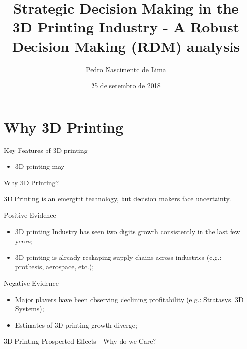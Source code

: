 \documentclass[ignorenonframetext,]{beamer}
\title{Strategic Decision Making in the 3D Printing Industry - A Robust
Decision Making (RDM) analysis}
\author{Pedro Nascimento de Lima}
\date{25 de setembro de 2018}
\providecommand{\tightlist}{%
  \setlength{\itemsep}{0pt}\setlength{\parskip}{0pt}}
\begin{document}
\frame{\titlepage}

\begin{frame}
\tableofcontents[hideallsubsections]
\end{frame}

\section{Why 3D Printing}\label{why-3d-printing}

\begin{frame}{Key Features of 3D printing}

\begin{itemize}
\tightlist
\item
  3D printing may
\end{itemize}

\end{frame}

\begin{frame}{Why 3D Printing?}

3D Printing is an emergint technology, but decision makers face
uncertainty.

\begin{block}{Positive Evidence}

\begin{itemize}
\tightlist
\item
  3D printing Industry has seen two digits growth consistently in the
  last few years;
\item
  3D printing is already reshaping supply chains across industries
  (e.g.: prothesis, aerospace, etc.);
\end{itemize}

\end{block}

\begin{block}{Negative Evidence}

\begin{itemize}
\tightlist
\item
  Major players have been observing declining profitability (e.g.:
  Stratasys, 3D Systems);
\item
  Estimates of 3D printing growth diverge;
\end{itemize}

\end{block}

\end{frame}

\begin{frame}{3D Printing Prospected Effects - Why do we Care?}

\end{frame}
\end{document}
